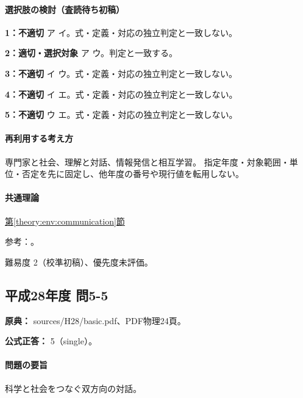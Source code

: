 \paragraph{選択肢の検討（査読待ち初稿）}\mbox{}\par

\noindent\textbf{1：不適切} ア イ。式・定義・対応の独立判定と一致しない。\par

\noindent\textbf{2：適切・選択対象} ア ウ。判定と一致する。\par

\noindent\textbf{3：不適切} イ ウ。式・定義・対応の独立判定と一致しない。\par

\noindent\textbf{4：不適切} イ エ。式・定義・対応の独立判定と一致しない。\par

\noindent\textbf{5：不適切} ウ エ。式・定義・対応の独立判定と一致しない。\par

\paragraph{再利用する考え方} 専門家と社会、理解と対話、情報発信と相互学習。 指定年度・対象範囲・単位・否定を先に固定し、他年度の番号や現行値を転用しない。

\paragraph{共通理論} \hyperref[theory:env:communication]{第\ref*{theory:env:communication}節}

\par 参考：\cite{env58_communication}。

\par 難易度 2（校準初稿）、優先度未評価。

\subsection{平成28年度 問5-5}
\label{q:h28-reg-basic-5-5}

\noindent\textbf{原典：} sources/H28/basic.pdf、PDF物理24頁。

\textbf{公式正答：} 5（single）。

\paragraph{問題の要旨} 科学と社会をつなぐ双方向の対話。

